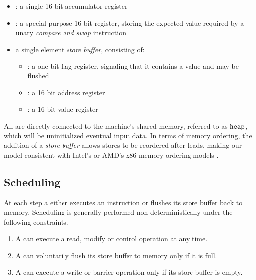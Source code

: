 \begin{itemize}
  \item \ACCU: a single 16 bit accumulator register
  \item \MEM: a special purpose 16 bit register, storing the expected value required by a unary \emph{compare and swap} instruction
  \item a single element \emph{store buffer}, consisting of:
    \begin{itemize}
      \item \SBFULL: a one bit flag register, signaling that it contains a value and may be flushed
      \item \SBADR: a 16 bit address register
      \item \SBVAL: a 16 bit value register
    \end{itemize}
\end{itemize}

All  are directly connected to the machine's shared memory, referred to as $\texttt{heap}$, which will be uninitialized  eventual input data.
In terms of memory ordering, the addition of a \emph{store buffer} allows stores to be reordered after loads, making our model consistent with Intel's or AMD's x86 memory ordering models \cite{ref:Intel, ref:AMD}.


\subsection*{Scheduling}

At each step  a  either executes an instruction or flushes its store buffer back to memory.
Scheduling is generally performed non-deterministically under the following constraints.

\begin{enumerate}
  \item A  can execute a read, modify or control operation at any time.
  \item A  can voluntarily flush its store buffer to memory only if it is full.
  \item A  can execute a write or barrier operation only if its store buffer is empty.
\end{enumerate}


